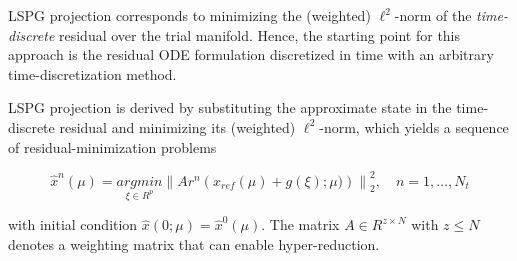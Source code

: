 L\+S\+PG projection corresponds to minimizing the (weighted) $\ell^2$-\/norm of the {\itshape time-\/discrete} residual over the trial manifold. Hence, the starting point for this approach is the residual O\+DE formulation discretized in time with an arbitrary time-\/discretization method.

L\+S\+PG projection is derived by substituting the approximate state in the time-\/discrete residual and minimizing its (weighted) $\ell^2$-\/norm, which yields a sequence of residual-\/minimization problems 

\[ \hat{x}^n(\mu) = \underset{\xi \in R^{p}}{arg min} \left\| A r^{n}\left(x_{ref}(\mu)+g(\xi);\mu)\right) \right\|_2^2,\quad n=1,\ldots,N_t \]

with initial condition $\hat{x}(0;\mu)=\hat{x}^0(\mu)$. The matrix $A \in R^{z \times N}$ with $z \leq N$ denotes a weighting matrix that can enable hyper-\/reduction. 